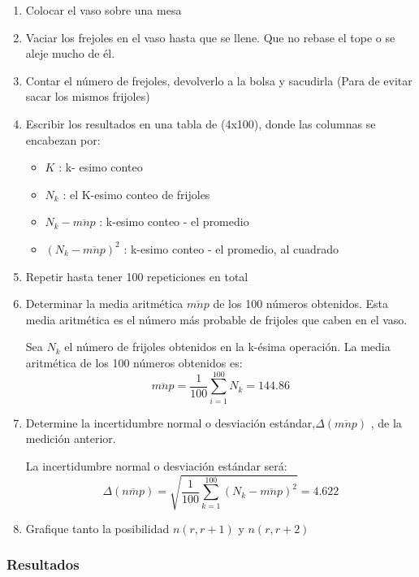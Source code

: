 \begin{enumerate}
	\item Colocar el vaso sobre una mesa
	\item Vaciar los frejoles en el vaso hasta que se llene. Que no rebase el tope o se aleje mucho de él.
	\item Contar el número de frejoles, devolverlo a la bolsa y sacudirla (Para de evitar sacar los mismos frijoles)
	\item Escribir los resultados en una tabla de (4x100), donde las columnas se encabezan por:
	      \begin{itemize}
		      \item $K$ : k- esimo conteo
		      \item $N_k$ : el K-esimo conteo de frijoles
		      \item $N_k - \overline{mnp}$ :  k-esimo conteo - el promedio
		      \item $(N_k - \overline{mnp})^2$ : k-esimo conteo - el promedio, al cuadrado
	      \end{itemize}
	\item Repetir hasta tener 100 repeticiones en total
	\item Determinar la media aritmética $\overline{mnp}$ de los 100 números obtenidos. Esta media aritmética es el número más probable de frijoles que caben en el vaso.

	      Sea $N_k$ el número de frijoles obtenidos en la k-ésima operación. La media aritmética de los 100 números obtenidos es:
	      \begin{equation*}
		      \overline{mnp}=\dfrac{1}{100}\sum_{i=1}^{100} N_k = 144.86
	      \end{equation*}
	\item Determine la incertidumbre normal o desviación estándar,$\Delta(\overline{mnp})$ , de la medición anterior.

	      La incertidumbre normal o desviación estándar será:
	      \begin{equation*}
		      \Delta(\overline{n m p})=\sqrt{\frac{1}{100} \sum_{k=1}^{100}\left(N_k-\overline{mnp}\right)^2}=4.622
	      \end{equation*}
	\item Grafique tanto la posibilidad $n(r,r+1)$ y $n(r,r+2)$

\end{enumerate}

\newpage
\subsubsection{Resultados}

